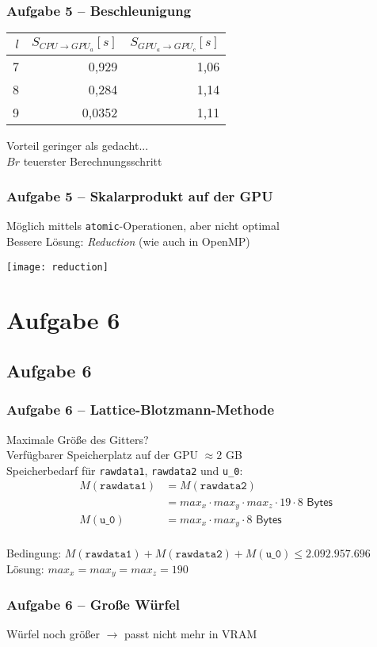 \documentclass[german,notes,18pt]{beamer}
\begin{document}
	\begin{frame}
		\frametitle{Aufgabe 5 -- Beschleunigung}
		\begin{center}
			\begin{tabular}{r|r|r}
			$l$ & $S_{CPU\rightarrow GPU_a}[s]$ & $S_{GPU_a\rightarrow GPU_c}[s]$ \\
			\hline
			7 & 0,929 & 1,06 \\
			8 & 0,284 & 1,14 \\
			9 & 0,0352 & 1,11
		\end{tabular}
		\end{center}
		Vorteil geringer als gedacht...\\
		$Br$ teuerster Berechnungsschritt
	\end{frame}
	\begin{frame}
		\frametitle{Aufgabe 5 -- Skalarprodukt auf der GPU}
		Möglich mittels \texttt{atomic}-Operationen, aber nicht optimal \\
		\vspace{2em}
		Bessere Lösung: \emph{Reduction} (wie auch in OpenMP)
		\begin{center}
			\texttt{[image: reduction]}
		\end{center}
	\end{frame}

	\section{Aufgabe 6}
	\subsection{Aufgabe 6}
	\begin{frame}
		\frametitle{Aufgabe 6 -- Lattice-Blotzmann-Methode}
		Maximale Größe des Gitters? \\
		Verfügbarer Speicherplatz auf der GPU $\approx2$ GB \\
		\vspace{2em}
		\pause
		Speicherbedarf für \texttt{rawdata1}, \texttt{rawdata2} und \texttt{u\_0}:
		\begin{equation*}
		\begin{split}
		M(\mathtt{rawdata1})&=M(\mathtt{rawdata2})\\
		&=max_x\cdot max_y\cdot max_z\cdot 19\cdot8\textsf{ Bytes} \\
		M(\mathtt{u\_0})&=max_x\cdot max_y\cdot 8\textsf{ Bytes}
		\end{split}
		\end{equation*}\\
		\vspace{2em}
		\pause
		Bedingung: $M(\mathtt{rawdata1})+M(\mathtt{rawdata2})+M(\mathtt{u\_0})\leq2.092.957.696$ \\
		Lösung: $max_x=max_y=max_z=190$
	\end{frame}
	\begin{frame}
		\frametitle{Aufgabe 6 -- Große Würfel}
		Würfel noch größer $\rightarrow$ passt nicht mehr in VRAM
	\end{frame}
\end{document}
